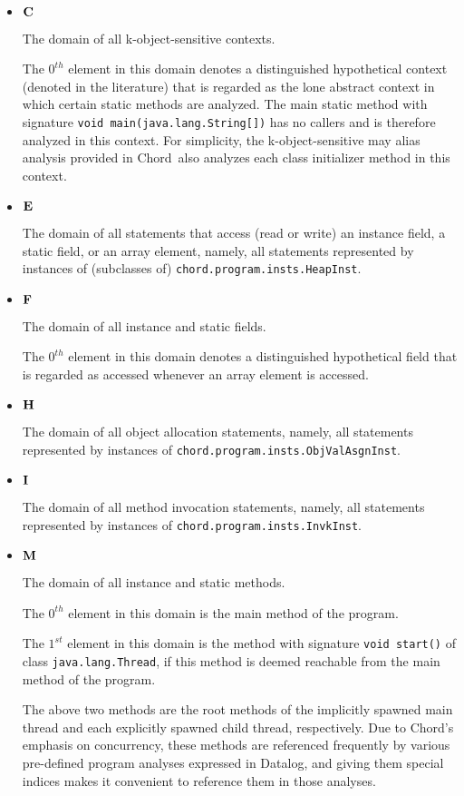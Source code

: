 \documentclass{article}
\providecommand\Mdom{{\bf M}}
\providecommand\Idom{{\bf I}}
\providecommand\Hdom{{\bf H}}
\providecommand\Edom{{\bf E}}
\providecommand\Fdom{{\bf F}}
\providecommand\Cdom{{\bf C}}
\providecommand\Chord{{Chord}}
\begin{document}
\begin{itemize}
\item
$\Cdom$

The domain of all k-object-sensitive contexts.

The $0^{th}$ element in this domain denotes a distinguished hypothetical
context (denoted  in the literature) that is regarded as the
lone abstract context in which certain static methods are analyzed.
The main static method with signature {\tt void main(java.lang.String[])}
has no callers and is therefore analyzed in this context.
For simplicity, the k-object-sensitive may alias analysis provided in
\Chord\ also analyzes each class initializer method in this context.

\item
$\Edom$

The domain of all statements that access (read or write) an instance field,
a static field, or an array element, namely, all statements
represented by instances of (subclasses of) {\tt chord.program.insts.HeapInst}.

\item
$\Fdom$

The domain of  all instance and static fields.

The $0^{th}$ element in this domain denotes a distinguished hypothetical
field that is regarded as accessed whenever an array element is
accessed.

\item
$\Hdom$

The domain of all object allocation statements, namely, all statements
represented by instances of {\tt chord.program.insts.ObjValAsgnInst}.

\item
$\Idom$

The domain of all method invocation statements, namely, all statements
represented by instances of {\tt chord.program.insts.InvkInst}.

\item
$\Mdom$

The domain of all instance and static methods.

The $0^{th}$ element in this domain is the main method of the program.

The $1^{st}$ element in this domain is the method with signature
{\tt void start()} of class {\tt java.lang.Thread}, if this
method is deemed reachable from the main method of the program.

The above two methods are the root methods of the implicitly spawned
main thread and each explicitly spawned child thread, respectively.
Due to \Chord's emphasis on concurrency, these methods are
referenced frequently by various pre-defined program analyses
expressed in Datalog, and giving them special indices makes it
convenient to reference them in those analyses.


\end{itemize}
\end{document}
